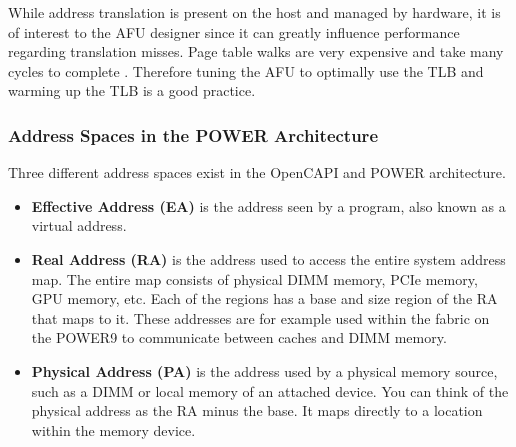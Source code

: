 While address translation is present on the host and managed by hardware, it is of interest to the AFU designer since it can greatly influence performance regarding translation misses. Page table walks are very expensive and take many cycles to complete \cite{curt}. Therefore tuning the AFU to optimally use the TLB and warming up the TLB is a good practice.



\subsubsection{Address Spaces in the POWER Architecture}
\label{sec:spaces}


Three different address spaces exist in the OpenCAPI and POWER architecture.
\begin{itemize}
  \item{\textbf{Effective Address (EA)} is the address seen by a program, also known as a virtual address.}
  \item{\textbf{Real Address (RA)} is the address used to access the entire system address map. The entire map consists of physical DIMM memory, PCIe memory, GPU memory, etc. Each of the regions has a base and size region of the RA that maps to it. These addresses are for example used within the fabric on the POWER9 to communicate between caches and DIMM memory.}
  \item{\textbf{Physical Address (PA)} is the address used by a physical memory source, such as a DIMM or local memory of an attached device. You can think of the physical address as the RA minus the base. It maps directly to a location within the memory device.}
\end{itemize}


